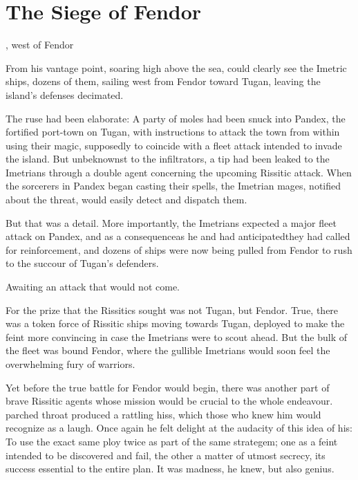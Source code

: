 \section{The Siege of Fendor}

\stamp
  {\dateSiegeofFendor}
  {\Risvalsea, west of Fendor}
%
%

From his vantage point, soaring high above the sea,  \Dasvedshiracht{} could clearly see the Imetric ships, dozens of them, sailing west from Fendor toward Tugan, leaving the island's defenses decimated. 

The ruse had been elaborate: A party of moles had been snuck into Pandex, the fortified port-town on Tugan, with instructions to attack the town from within using their magic, supposedly to coincide with a fleet attack intended to invade the island. But unbeknownst to the infiltrators, a tip had been leaked to the Imetrians through a double agent concerning the upcoming Rissitic attack. When the sorcerers in Pandex began casting their spells, the Imetrian mages, notified about the threat, would easily detect and dispatch them. 

But that was a detail. More importantly, the Imetrians expected a major fleet attack on Pandex, and as a consequence\dash{}as he and \Narkiza{} had anticipated\dash{}they had called for reinforcement, and dozens of ships were now being pulled from Fendor to rush to the succour of Tugan's defenders. 

Awaiting an attack that would not come. 

For the prize that the Rissitics sought was not Tugan, but Fendor. True, there was a token force of Rissitic ships moving towards Tugan, deployed to make the feint more convincing in case the Imetrians were to scout ahead. But the bulk of the fleet was bound Fendor, where the gullible Imetrians would soon feel the overwhelming fury of \Nechsainz{} warriors. 

Yet before the true battle for Fendor would begin, there was another part of brave Rissitic agents whose mission would be crucial to the whole endeavour. \Dasvedshirachtz{} parched throat produced a rattling hiss, which those who knew him would recognize as a laugh. Once again he felt delight at the audacity of this idea of his: To use the exact same ploy twice as part of the same strategem; one as a feint intended to be discovered and fail, the other a matter of utmost secrecy, its success essential to the entire plan. It was madness, he knew, but also genius. 

